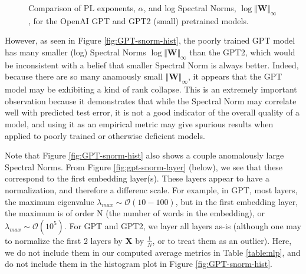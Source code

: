 \begin{figure}
    \centering
   \caption{Comparison of PL exponents, $\alpha$, and log Spectral Norms, $\log\Vert\mathbf{W}\Vert_{\infty}$, for the OpenAI GPT and GPT2 (small) pretrained models.}
\label{fig:GPT-hist}
\end{figure}

However, as seen in Figure \ref{fig:GPT-snorm-hist},
 the poorly trained GPT model has many smaller (log) Spectral Norms $\log\Vert\mathbf{W}\Vert_{\infty}$
than the GPT2, which would be inconsistent with a belief that smaller Spectral Norm is always better.
Indeed, because there are so many anamously small $\Vert\mathbf{W}\Vert_{\infty}$,
it appears that the GPT model may be exhibiting a kind of rank collapse.
This is an extremely important observation because it demonstrates that while the Spectral Norm
may correlate well with predicted test error, it is not a good indicator of the overall quality of a model,
and using it as an empirical metric may give spurious results when applied to poorly trained
or otherwise deficient models.  


Note that Figure \ref{fig:GPT-snorm-hist} also shows a couple anomalously  large Spectral Norms.
From Figure \ref{fig:gpt-snorm-layer} (below), we see that these correspond to the first embedding layer(s).
These layers appear to have a normalization, and therefore a differenc scale.
For example, in GPT, most layers, the maximum eigenvalue $\lambda_{max}\sim\mathcal{O}(10-100)$,
but in the first embedding layer, the maximum is of order N (the number of words in the embedding), or
 $\lambda_{max}\sim\mathcal{O}(10^{5})$.  For GPT and GPT2, we layer all layers as-is (although one may to normalize
the first 2 layers by  $\mathbf{X}$ by $\frac{1}{N}$, or to treat them as an outlier).
Here, we do not include them in our computed average metrics in Table \ref{table:nlp},
and do not include them in the histogram plot in Figure \ref{fig:GPT-snorm-hist}.


